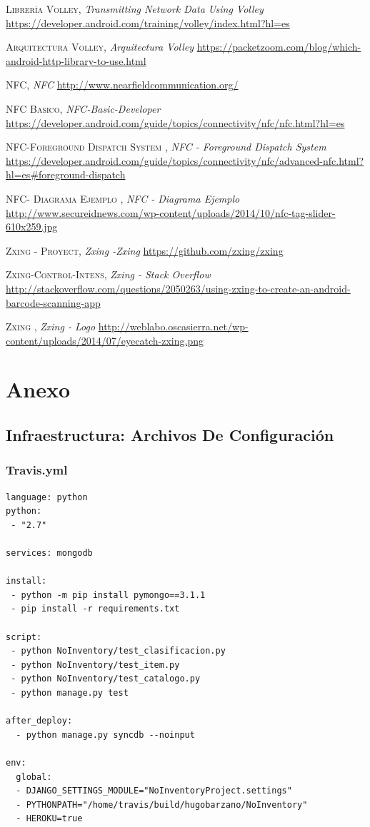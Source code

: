 \documentclass[a4paper,11pt]{book}
\begin{document}
\begin{thebibliography}{aaaa}
 \textsc{Librería Volley},
\textit{Transmitting Network Data Using Volley}
\url{https://developer.android.com/training/volley/index.html?hl=es}

 \textsc{Arquitectura Volley},
\textit{Arquitectura Volley}
\url{https://packetzoom.com/blog/which-android-http-library-to-use.html}

 \textsc{NFC},
\textit{NFC}
\url{http://www.nearfieldcommunication.org/}

 \textsc{NFC Basico},
\textit{NFC-Basic-Developer}
\url{https://developer.android.com/guide/topics/connectivity/nfc/nfc.html?hl=es}

 \textsc{ NFC-Foreground Dispatch System },
\textit{NFC -  Foreground Dispatch System}
\url{https://developer.android.com/guide/topics/connectivity/nfc/advanced-nfc.html?hl=es#foreground-dispatch}


 \textsc{ NFC- Diagrama Ejemplo },
\textit{NFC -  Diagrama Ejemplo}
\url{http://www.secureidnews.com/wp-content/uploads/2014/10/nfc-tag-slider-610x259.jpg}

 \textsc{ Zxing - Proyect},
\textit{Zxing -Zxing}
\url{https://github.com/zxing/zxing}

 \textsc{ Zxing-Control-Intens},
\textit{Zxing - Stack Overflow}
\url{http://stackoverflow.com/questions/2050263/using-zxing-to-create-an-android-barcode-scanning-app}


 \textsc{ Zxing },
\textit{Zxing - Logo}
\url{http://weblabo.oscasierra.net/wp-content/uploads/2014/07/eyecatch-zxing.png}

\end{thebibliography}
 

\chapter{Anexo}
\section{Infraestructura: Archivos De Configuración}
\subsection{Travis.yml}\label{sec:travis}
\begin{lstlisting}
language: python
python:
 - "2.7"

services: mongodb

install:
 - python -m pip install pymongo==3.1.1
 - pip install -r requirements.txt

script:
 - python NoInventory/test_clasificacion.py
 - python NoInventory/test_item.py
 - python NoInventory/test_catalogo.py
 - python manage.py test
 
after_deploy:
  - python manage.py syncdb --noinput

env:
  global:
  - DJANGO_SETTINGS_MODULE="NoInventoryProject.settings"
  - PYTHONPATH="/home/travis/build/hugobarzano/NoInventory"
  - HEROKU=true

\end{lstlisting}
\end{document}
